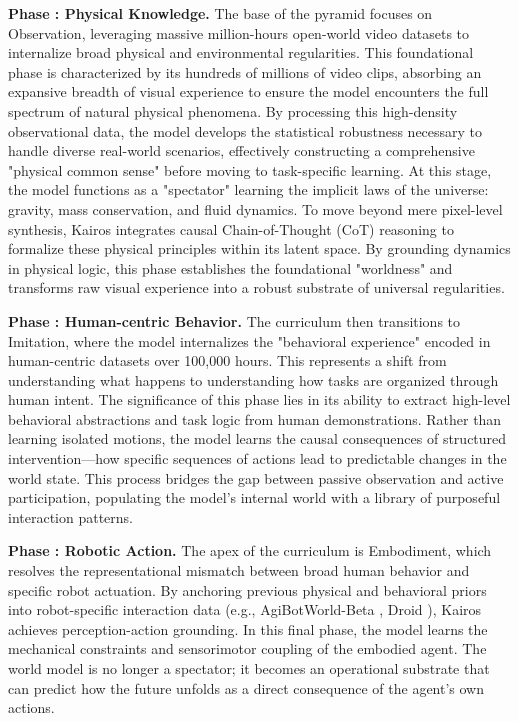 \documentclass{llmxive}
\begin{document}
\textbf{Phase \uppercase\expandafter{}: Physical Knowledge.} 
The base of the pyramid focuses on Observation, leveraging massive million-hours open-world video datasets to internalize broad physical and environmental regularities. This foundational phase is characterized by its hundreds of millions of video clips, absorbing an expansive breadth of visual experience to ensure the model encounters the full spectrum of natural physical phenomena. By processing this high-density observational data, the model develops the statistical robustness necessary to handle diverse real-world scenarios, effectively constructing a comprehensive "physical common sense" before moving to task-specific learning. At this stage, the model functions as a "spectator" learning the implicit laws of the universe: gravity, mass conservation, and fluid dynamics. To move beyond mere pixel-level synthesis, Kairos integrates causal Chain-of-Thought (CoT) reasoning to formalize these physical principles within its latent space. By grounding dynamics in physical logic, this phase establishes the foundational "worldness" and transforms raw visual experience into a robust substrate of universal regularities.




\textbf{Phase \uppercase\expandafter{}: Human-centric Behavior.}
The curriculum then transitions to Imitation, where the model internalizes the "behavioral experience" encoded in human-centric datasets over 100,000 hours. This represents a shift from understanding what happens to understanding how tasks are organized through human intent. The significance of this phase lies in its ability to extract high-level behavioral abstractions and task logic from human demonstrations. Rather than learning isolated motions, the model learns the causal consequences of structured intervention—how specific sequences of actions lead to predictable changes in the world state. This process bridges the gap between passive observation and active participation, populating the model’s internal world with a library of purposeful interaction patterns.




\textbf{Phase \uppercase\expandafter{}: Robotic Action.}
The apex of the curriculum is Embodiment, which resolves the representational mismatch between broad human behavior and specific robot actuation. By anchoring previous physical and behavioral priors into robot-specific interaction data (e.g., AgiBotWorld-Beta  \cite{AgiBotWorldContributors2025AgiBotWC}, Droid \cite{khazatsky2024droid}), Kairos achieves perception-action grounding. In this final phase, the model learns the mechanical constraints and sensorimotor coupling of the embodied agent. The world model is no longer a spectator; it becomes an operational substrate that can predict how the future unfolds as a direct consequence of the agent's own actions. 
\end{document}
